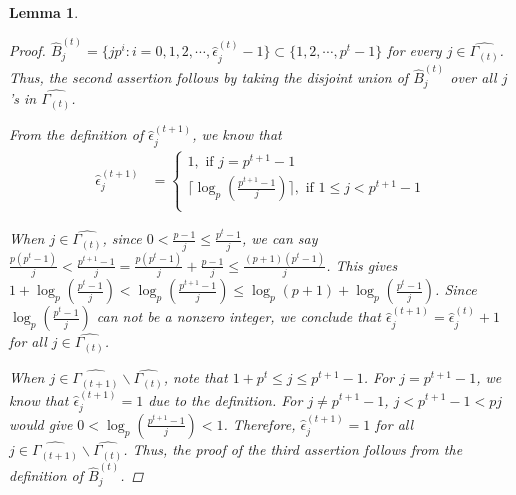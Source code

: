 \documentclass[pdflatex,sn-mathphys-num]{sn-jnl}%
\newtheorem{lemma}{Lemma}
\theoremstyle{thmstyleone}%
\theoremstyle{thmstyletwo}%
\theoremstyle{thmstylethree}%
\begin{document}
\begin{lemma}
\begin{proof}
            $\hat{B}_{j}^{(t)}=\{jp^{i}:i=0,1,2,\cdots,\hat{\epsilon}_{j}^{(t)}-1\}\subset\{1,2,\cdots,p^t-1\}$ for every $j\in\widehat{\Gamma_{(t)}}$. Thus, the second assertion follows by taking the disjoint union of $\hat{B}_{j}^{(t)}$ over all $j$'s in $\widehat{\Gamma_{(t)}}$.   
\par From the definition of $\hat{\epsilon}_{j}^{(t+1)}$, we know that 
\begin{align*}
         \hat{\epsilon}_{j}^{(t+1)} &= \begin{cases}
             1,\text{ if }j=p^{t+1}-1 \\
             \Big\lceil\operatorname{log}_{p}\left(\frac{p^{t+1}-1}{j}\right)\Big\rceil,\text{ if }1\leq j<p^{t+1}-1 \\
         \end{cases} 
     \end{align*}
     \par
 When $j\in\widehat{\Gamma_{(t)}}$, since $0<\frac{p-1}{j}\leq\frac{p^t-1}{j}$, we can say  $\frac{p(p^t-1)}{j}<\frac{p^{t+1}-1}{j}=\frac{p(p^t-1)}{j}+\frac{p-1}{j}\leq\frac{(p+1)(p^t-1)}{j}$. This gives  $1+\operatorname{log}_{p}\left(\frac{p^t-1}{j}\right)<\operatorname{log}_{p}\left(\frac{p^{t+1}-1}{j}\right)\leq\operatorname{log}_{p}\left(p+1\right)+\operatorname{log}_{p}\left(\frac{p^t-1}{j}\right)$. Since $\operatorname{log}_{p}\left(\frac{p^t-1}{j}\right)$ can not be a nonzero integer, we conclude that $\hat{\epsilon}_{j}^{(t+1)}=\hat{\epsilon}_{j}^{(t)}+1$ for all $j\in\widehat{\Gamma_{(t)}}$.
\par When $j\in\widehat{\Gamma_{(t+1)}}\backslash\widehat{\Gamma_{(t)}}$, note that $1+p^{t}\leq j\leq p^{t+1}-1$. For $j=p^{t+1}-1$, we know that $\hat{\epsilon}_{j}^{(t+1)} =1$ due to the definition. For $j\neq p^{t+1}-1$, $j<p^{t+1}-1<pj$ would give $0<\operatorname{log}_{p}\left(\frac{p^{t+1}-1}{j}\right)<1$. Therefore, $\hat{\epsilon}_{j}^{(t+1)} =1$ for all $j\in\widehat{\Gamma_{(t+1)}}\backslash\widehat{\Gamma_{(t)}}$.
\newline
Thus, the proof of the third assertion follows from the definition of $\hat{B}_{j}^{(t)}$.
         \end{proof}
     \end{lemma}
\end{document}
